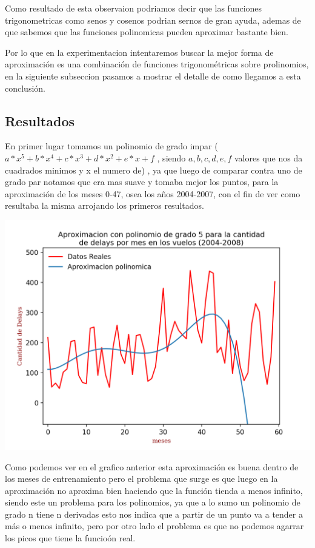\documentclass{endm}
\begin{document}
Como resultado de esta observaion podriamos decir que las funciones trigonometricas como senos y cosenos podrian sernos de gran ayuda, ademas de que sabemos que las funciones polinomicas pueden aproximar bastante bien.

Por lo que en la experimentacion intentaremos buscar la mejor forma de aproximaci\'on es una combinaci\'on de funciones trigonom\'etricas sobre prolinomios, en la siguiente subseccion pasamos a mostrar el detalle de como llegamos a esta conclusi\'on.

\subsection{Resultados}
En primer lugar tomamos un polinomio de grado impar ($a*x^5+b*x^4+c*x^3+d*x^2+e*x+f$ , siendo $a,b,c,d,e,f$ valores que nos da cuadrados minimos y x el numero de) , ya que luego de comparar contra uno de grado par notamos que era mas suave y tomaba mejor los puntos, para la aproximaci\'on de los meses 0-47, osea los años 2004-2007, con el fin de ver como resultaba la misma arrojando los primeros resultados.

	\begin{center}
	\includegraphics[scale=0.7]{imagenes/delaysPolinomio.png}
	\end{center}

Como podemos ver en el grafico anterior esta aproximaci\'on es buena dentro de los meses de entrenamiento pero el problema que surge es que luego en la aproximaci\'on no aproxima bien haciendo que la funci\'on tienda a menos infinito, siendo este un problema para los polinomios, ya que a lo sumo un polinomio de grado n tiene n derivadas esto nos indica que a partir de un punto va a tender a m\'as o  menos infinito, pero por otro lado el problema es que no podemos agarrar los picos que tiene la funcio\'on real.
\end{document}
